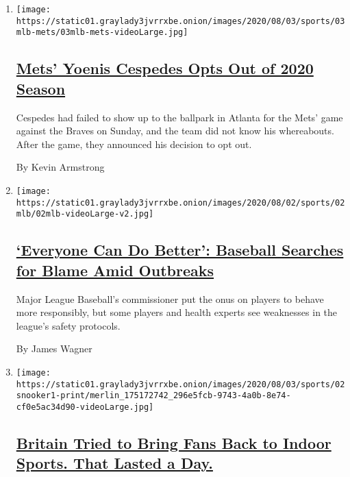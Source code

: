 \begin{enumerate}
\def\labelenumi{\arabic{enumi}.}
\item
  \texttt{[image: https://static01.graylady3jvrrxbe.onion/images/2020/08/03/sports/03mlb-mets/03mlb-mets-videoLarge.jpg]}

  \hypertarget{mets-yoenis-cespedes-opts-out-of-2020-season}{%
  \subsection{\texorpdfstring{\href{/2020/08/02/sports/baseball/Yoenis-cespedes-opt-out-rule.html}{Mets'
  Yoenis Cespedes Opts Out of 2020
  Season}}{Mets' Yoenis Cespedes Opts Out of 2020 Season}}\label{mets-yoenis-cespedes-opts-out-of-2020-season}}

  Cespedes had failed to show up to the ballpark in Atlanta for the
  Mets' game against the Braves on Sunday, and the team did not know his
  whereabouts. After the game, they announced his decision to opt out.

  By Kevin Armstrong
\item
  \texttt{[image: https://static01.graylady3jvrrxbe.onion/images/2020/08/02/sports/02mlb/02mlb-videoLarge-v2.jpg]}

  \hypertarget{everyone-can-do-better-baseball-searches-for-blame-amid-outbreaks}{%
  \subsection{\texorpdfstring{\href{/2020/08/02/sports/baseball/mlb-coronavirus-outbreaks.html}{`Everyone
  Can Do Better': Baseball Searches for Blame Amid
  Outbreaks}}{`Everyone Can Do Better': Baseball Searches for Blame Amid Outbreaks}}\label{everyone-can-do-better-baseball-searches-for-blame-amid-outbreaks}}

  Major League Baseball's commissioner put the onus on players to behave
  more responsibly, but some players and health experts see weaknesses
  in the league's safety protocols.

  By James Wagner
\item
  \texttt{[image: https://static01.graylady3jvrrxbe.onion/images/2020/08/03/sports/02snooker1-print/merlin\_175172742\_296e5fcb-9743-4a0b-8e74-cf0e5ac34d90-videoLarge.jpg]}

  \hypertarget{britain-tried-to-bring-fans-back-to-indoor-sports-that-lasted-a-day}{%
  \subsection{\texorpdfstring{\href{/2020/08/02/sports/snooker-world-championship.html}{Britain
  Tried to Bring Fans Back to Indoor Sports. That Lasted a
  Day.}}{Britain Tried to Bring Fans Back to Indoor Sports. That Lasted a Day.}}\label{britain-tried-to-bring-fans-back-to-indoor-sports-that-lasted-a-day}}


\end{enumerate}
